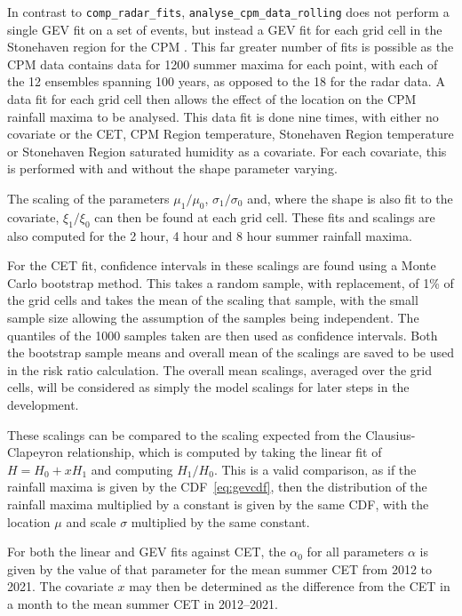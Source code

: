 In contrast to \texttt{comp\_radar\_fits},
    \texttt{analyse\_cpm\_data\_rolling} does not perform a single GEV fit on a set of events,
    but instead a GEV fit for each grid cell in the Stonehaven region for the CPM .
This far greater number of fits is possible as the CPM data contains data for 1200 summer maxima for each point,
    with each of the 12 ensembles spanning 100 years,
    as opposed to the 18 for the radar data.
A data fit for each grid cell then allows the effect of the location on the CPM rainfall maxima to be analysed.
This data fit is done nine times,
    with either no covariate or the CET, CPM Region temperature, Stonehaven Region temperature or Stonehaven Region saturated humidity as a covariate.
For each covariate, this is performed with and without the shape parameter varying.

The scaling of the parameters $\mu_1 / \mu_0$, $\sigma_1 / \sigma_0$ and, where the shape is also fit to the covariate,
    $\xi_1 / \xi_0$ can then be found at each grid cell.
These fits and scalings are also computed for the 2 hour, 4 hour and 8 hour summer rainfall maxima.

For the CET fit,
    confidence intervals in these scalings are found using a Monte Carlo bootstrap method.
This takes a random sample, with replacement, of 1\% of the grid cells and takes the mean of the scaling that sample,
    with the small sample size allowing the assumption of the samples being independent.
The quantiles of the 1000 samples taken are then used as confidence intervals.
Both the bootstrap sample means and overall mean of the scalings are saved to be used in the risk ratio calculation.
The overall mean scalings,
    averaged over the grid cells,
    will be considered as simply the model scalings for later steps in the development.

These scalings can be compared to the scaling expected from the Clausius-Clapeyron relationship,
    which is computed by taking the linear fit of $H = H_0 + xH_1$ and computing $H_1 / H_0$.
This is a valid comparison, as if the rainfall maxima is given by the CDF~\ref{eq:gevcdf},
    then the distribution of the rainfall maxima multiplied by a constant is given by the same CDF,
    with the location $\mu$ and scale $\sigma$ multiplied by the same constant.

For both the linear and GEV fits against CET, the $\alpha_0$ for all parameters $\alpha$ is given by the value of that parameter for
    the mean summer CET from 2012 to 2021.
The covariate $x$ may then be determined as the difference from the CET in a month to the mean summer CET in 2012--2021.


